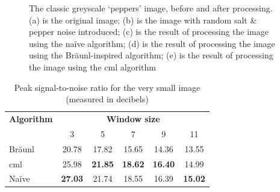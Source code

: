 \begin{figure}
\caption[The classic grayscale `peppers' image, before and after processing]{\label{fig:median:peppers}The classic greyscale `peppers' image, before and after processing.  (a) is the original image; (b) is the image with random salt \& pepper noise introduced; (c) is the result of processing the image using the naïve algorithm; (d) is the result of processing the image using the Br\"{a}unl-inspired algorithm; (e) is the result of processing the image using the \gls{cml} algorithm}
\end{figure}

\begin{table}
\centering
\caption[Peak signal-to-noise for the very small image]{Peak signal-to-noise ratio for the very small image (measured in decibels)}
\label{tab:median:psnrvsmall}
\begin{tabular}{@{}lccccc@{}}
\toprule
\multicolumn{1}{c}{\textbf{Algorithm}} & \multicolumn{5}{c}{\textbf{Window size}}                                          \\
                                       & 3              & 5              & 7              & 9             & 11             \\ \midrule
Bräunl                                 & 20.78          & 17.82          & 15.65          & 14.36         & 13.55          \\
\gls{cml}                                    & 25.98          & \textbf{21.85} & \textbf{18.62} & \textbf{16.40} & 14.99          \\
Naïve                                  & \textbf{27.03} & 21.74          & 18.55          & 16.39         & \textbf{15.02} \\ \bottomrule
\end{tabular}
\end{table}

